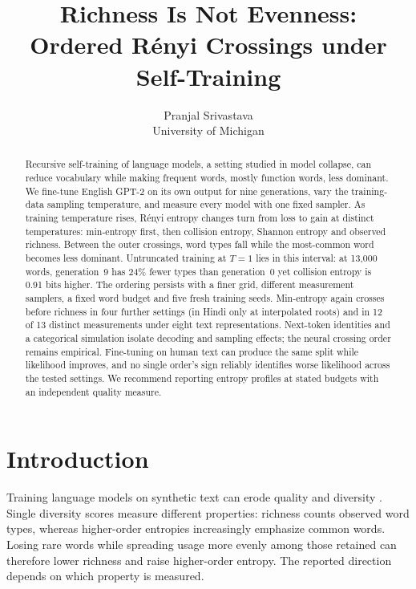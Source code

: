 \documentclass[10pt]{article}
\title{Richness Is Not Evenness:\\Ordered R\'enyi Crossings under Self-Training}
\author{\name Pranjal Srivastava \\
 \addr University of Michigan}
\theoremstyle{plain}
\theoremstyle{definition}
\begin{document}
\maketitle
\begingroup
\renewcommand\thefootnote{}
\addtocounter{footnote}{-1}
\endgroup

\begin{abstract}
Recursive self-training of language models, a setting studied in model collapse, can reduce
vocabulary while making frequent words, mostly function words, less dominant.
We fine-tune English GPT-2 on its own output for nine generations, vary the training-data
sampling temperature, and measure every model with one fixed sampler. As training temperature
rises, R\'enyi entropy changes turn from loss to gain at distinct temperatures: min-entropy
first, then collision entropy, Shannon entropy and observed richness. Between the outer
crossings, word types fall while the most-common word becomes less dominant. Untruncated
training at $T=1$ lies in this interval: at 13,000 words, generation~9 has 24\% fewer types than
generation~0 yet collision entropy is 0.91 bits higher. The ordering persists with a finer grid,
different measurement samplers, a fixed word budget and five fresh training seeds. Min-entropy again crosses
before richness in four further settings (in Hindi only at interpolated roots) and in 12 of
13 distinct measurements under eight text representations. Next-token identities and a
categorical simulation isolate decoding and sampling effects; the neural crossing order
remains empirical. Fine-tuning on human text can produce the same split while likelihood
improves, and no single order's sign reliably identifies worse likelihood across the tested
settings. We recommend reporting entropy profiles at stated budgets with an independent
quality measure.
\end{abstract}

\section{Introduction}
\label{sec:intro}

Training language models on synthetic text can erode quality and diversity
\citep{shumailov2024,dohmatob2024}. Single diversity scores measure different properties:
richness counts observed word types, whereas higher-order entropies increasingly emphasize
common words. Losing rare words while spreading usage more evenly among those retained can
therefore lower richness and raise higher-order entropy. The reported direction depends on
which property is measured.
\end{document}
